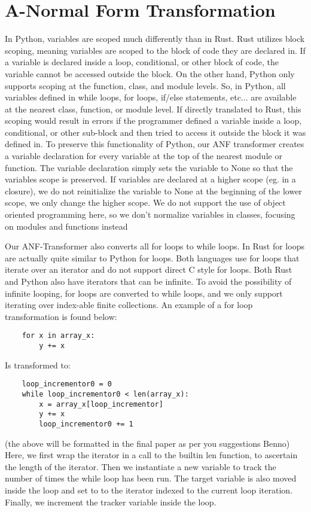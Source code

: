 \documentclass[acmsmall,review,authorversion]{acmart}
\begin{document}
\section{A-Normal Form Transformation}

\label{section:anf}
 In Python, variables are scoped much differently than in Rust. Rust utilizes block scoping, meaning variables are scoped to the block of code they are declared in. If a variable is declared inside a loop, conditional, or other block of code, the variable cannot be accessed outside the block. On the other hand, Python only supports scoping at the function, class, and module levels. So, in Python, all variables defined in while loops, for loops, if/else statements, etc... are available at the nearest class, function, or module level. If directly translated to Rust, this scoping would result in errors if the programmer defined a variable inside a loop, conditional, or other sub-block and then tried to access it outside the block it was defined in. To preserve this functionality of Python, our ANF transformer creates a variable declaration for every variable at the top of the nearest module or function. The variable declaration simply sets the variable to None so that the variables scope is preserved. If variables are declared at a higher scope (eg. in a closure), we do not reinitialize the variable to None at the beginning of the lower scope, we only change the higher scope.  We do not support the use of object oriented programming here, so we don't normalize variables in classes, focusing on modules and functions instead 
 \par
 Our ANF-Transformer also converts all for loops to while loops. In Rust for loops are actually quite similar to Python for loops. Both languages use for loops that iterate over an iterator and do not support direct C style for loops. Both Rust and Python also have iterators that can be infinite. To avoid the possibility of infinite looping, for loops are converted to while loops, and we only support iterating over index-able finite collections. An example of a for loop transformation is found below:
\begin{verbatim}
    for x in array_x:
        y += x
 \end{verbatim}
 
 Is transformed to: 
 \begin{verbatim}
    loop_incrementor0 = 0
    while loop_incrementor0 < len(array_x):
        x = array_x[loop_incrementor]
        y += x 
        loop_incrementor0 += 1
\end{verbatim}
(the above will be formatted in the final paper as per you suggestions Benno)
Here, we first wrap the iterator in a call to the builtin len function, to ascertain the length of the iterator. Then we instantiate a new variable to track the number of times the while loop has been run. The target variable is also moved inside the loop and set to to the iterator indexed to the current loop iteration. Finally, we increment the tracker variable inside the loop. 
\end{document}

